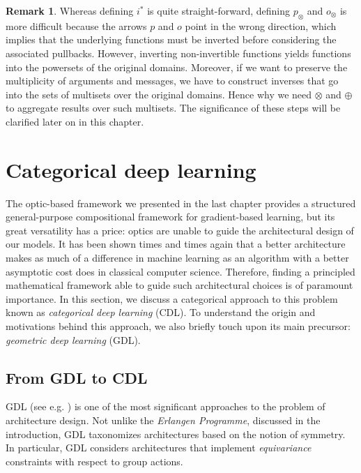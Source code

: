 \documentclass[11pt,a4paper,openright,twoside]{report}
\newcounter{mycounter}
\theoremstyle{plain}
\theoremstyle{definition}
\newtheorem{remark}[mycounter]{Remark}
\begin{document}
\begin{remark}
  Whereas defining $i^*$ is quite straight-forward, defining $p_{\otimes}$ and $o_{\otimes}$ is more difficult because the arrows $p$ and $o$ point in the wrong direction, which implies that the underlying functions must be inverted before considering the associated pullbacks. However, inverting non-invertible functions yields functions into the powersets of the original domains. Moreover, if we want to preserve the multiplicity of arguments and messages, we have to construct inverses that go into the sets of multisets over the original domains. Hence why we need $\otimes$ and $\oplus$ to aggregate results over such multisets.
  The significance of these steps will be clarified later on in this chapter.
\end{remark}



\section{Categorical deep learning}

The optic-based framework we presented in the last chapter provides a structured general-purpose compositional framework for gradient-based learning, but its great versatility has a price: optics are unable to guide the architectural design of our models. It has been shown times and times again that a better architecture makes as much of a difference in machine learning as an algorithm with a better asymptotic cost does in classical computer science. 
Therefore, finding a principled mathematical framework able to guide such architectural choices is of paramount importance. In this section, we discuss a categorical approach to this problem known as \textit{categorical deep learning} (CDL). To understand the origin and motivations behind this approach, we also briefly touch upon its main precursor: \textit{geometric deep learning} (GDL).

\subsection{From GDL to CDL}

GDL (see e.g. \cite{bronstein2021geometric}) is one of the most significant approaches to the problem of architecture design. Not unlike the \textit{Erlangen Programme}, discussed in the introduction, GDL taxonomizes architectures based on the notion of symmetry. In particular, GDL considers architectures that implement \textit{equivariance} constraints with respect to group actions.
\end{document}

